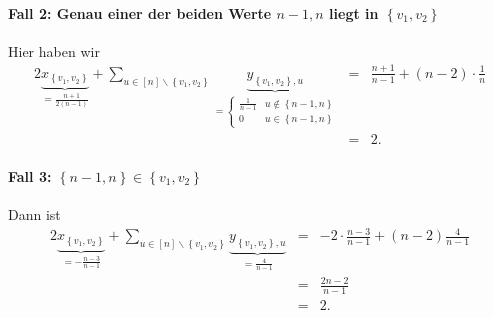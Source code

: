 \documentclass[10p,a4paper,BCOR = 12mm, DIV=15]{scrbook}
\begin{document}
\begin{bew}
\paragraph{Fall 2: Genau einer der beiden Werte $n-1, n$ liegt in $\left\{v_1, v_2\right\}$} Hier haben wir
\begin{eqnarray*}
2 \underbrace{x_{\left\{v_1, v_2\right\}}}_{= \frac{n+1}{2\left(n-1\right)}} + \sum_{u\in[n]\backslash\left\{v_1, v_2\right\}} \underbrace{y_{\left\{v_1, v_2\right\}, u}}_{ = \begin{cases}
\frac{1}{n-1} & u\notin \left\{n-1, n\right\} \\
0 & u\in \left\{n-1, n\right\}
\end{cases}} & = & \frac{n+1}{n-1} + \left(n-2\right) \cdot \frac{1}{n} \\
& = & 2.
\end{eqnarray*}

\paragraph{Fall 3: $\left\{n-1, n\right\} \in \left\{v_1, v_2\right\}$} Dann ist
\begin{eqnarray*}
2 \underbrace{x_{\left\{v_1, v_2\right\}}}_{= -\frac{n-3}{n-1}} + \sum_{u\in[n]\backslash\left\{v_1, v_2\right\}} \underbrace{y_{\left\{v_1, v_2\right\}, u}}_{= \frac{4}{n-1}}
& = & - 2 \cdot \frac{n-3}{n-1} + \left(n-2\right) \frac{4}{n-1} \\
& = & \frac{2 n-2}{n-1} \\
& = & 2.
\end{eqnarray*}
\end{bew}
\end{document}
